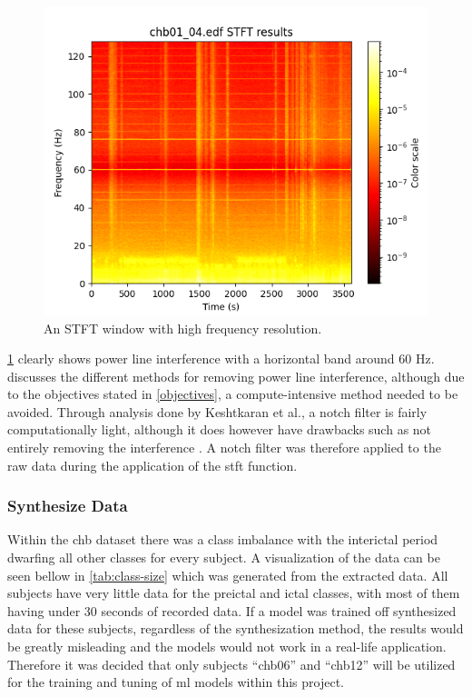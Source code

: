 \documentclass[12pt]{article}
\begin{document}
\begin{figure}[H]
\includegraphics[width=\textwidth]{stft1}
\centering
\caption{An STFT window with high frequency resolution.}
\label{fig:stft1}
\end{figure}

\ref{fig:stft1} clearly shows power line interference with a horizontal band around 60 Hz. \cite{keshtkaran2014fast} discusses the different methods for removing power line interference, although due to the objectives stated in \ref{objectives}, a compute-intensive method needed to be avoided. Through analysis done by Keshtkaran et al., a notch filter is fairly computationally light, although it does however have drawbacks such as not entirely removing the interference \cite{keshtkaran2014fast}. A notch filter was therefore applied to the raw data during the application of the \acrshort{stft} function.


\subsubsection{Synthesize Data}\label{synthesize-data}

Within the \acrshort{chb} dataset there was a class imbalance with the interictal period dwarfing all other classes for every subject. A visualization of the data can be seen bellow in \ref{tab:class-size} which was generated from the extracted data. All subjects have very little data for the preictal and ictal classes, with most of them having under 30 seconds of recorded data. If a model was trained off synthesized data for these subjects, regardless of the synthesization method, the results would be greatly misleading and the models would not work in a real-life application. Therefore it was decided that only subjects ``chb06'' and ``chb12'' will be utilized for the training and tuning of \acrshort{ml} models within this project.
\end{document}
